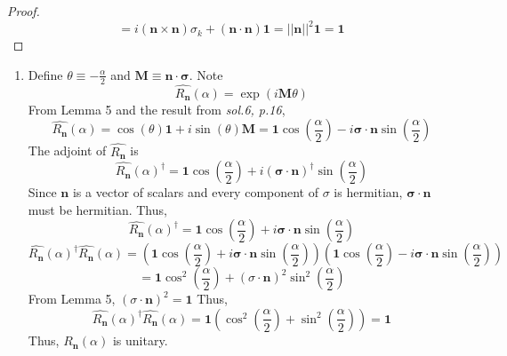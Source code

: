 \begin{sol}
\begin{proof}
\begin{equation}
\end{equation} 
\begin{equation}
	=i(\mathbf{n}\times\mathbf{n})\sigma_k+(\mathbf{n}\cdot\mathbf{n})\mathbf{1}=||\mathbf{n}||^2\mathbf{1}=\mathbf{1}
\end{equation}
\end{proof}
\begin{enumerate}[label=\textbf{(\alph*)}]
\item
Define $\theta\equiv-\frac{\alpha}{2}$ and $\mathbf{M}\equiv\mathbf{n}\cdot\mathbf{\sigma} $. Note \begin{equation}
	\hat{R_\mathbf{n}}(\alpha) = \exp(i\mathbf{M}\theta)
\end{equation}
From Lemma 5 and the result from \textit{sol.6, p.16},
\begin{equation}
	\hat{R_\mathbf{n}}(\alpha) =\cos(\theta)\mathbf{1}+i\sin(\theta)\mathbf{M}=\mathbf{1}\cos(\frac{\alpha}{2})-i\mathbf{\sigma}\cdot\mathbf{n}\sin(\frac{\alpha}{2})
\end{equation} The adjoint of $\hat{R_\mathbf{n}}$ is 
\begin{equation}
	\hat{R_\mathbf{n}}(\alpha)^\dagger=\mathbf{1}\cos(\frac{\alpha}{2})+i(\mathbf{\sigma}\cdot\mathbf{n})^\dagger\sin(\frac{\alpha}{2})
\end{equation}
Since $\mathbf{n}$ is a vector of scalars and every component of $\sigma$ is hermitian, $\mathbf{\sigma}\cdot\mathbf{n}$ must be hermitian. Thus, 
\begin{equation}
	\hat{R_\mathbf{n}}(\alpha)^\dagger=\mathbf{1}\cos(\frac{\alpha}{2})+i\mathbf{\sigma}\cdot\mathbf{n}\sin(\frac{\alpha}{2})
\end{equation}
\begin{equation}
	\hat{R_\mathbf{n}}(\alpha)^\dagger\hat{R_\mathbf{n}}(\alpha)=(\mathbf{1}\cos(\frac{\alpha}{2})+i\mathbf{\sigma}\cdot\mathbf{n}\sin(\frac{\alpha}{2}))(\mathbf{1}\cos(\frac{\alpha}{2})-i\mathbf{\sigma}\cdot\mathbf{n}\sin(\frac{\alpha}{2}))
\end{equation} \begin{equation}
	=\mathbf{1}\cos^2(\frac{\alpha}{2})+(\sigma\cdot\mathbf{n})^2\sin^2(\frac{\alpha}{2})
\end{equation} From Lemma 5, $(\sigma\cdot\mathbf{n})^2=\mathbf{1}$ Thus,
\begin{equation}
	\hat{R_\mathbf{n}}(\alpha)^\dagger\hat{R_\mathbf{n}}(\alpha)=\mathbf{1}(\cos^2(\frac{\alpha}{2})+\sin^2(\frac{\alpha}{2}))=\mathbf{1}
\end{equation} Thus, $\hat{R_\mathbf{n}}(\alpha)$ is unitary.

\end{enumerate}
\end{sol}

